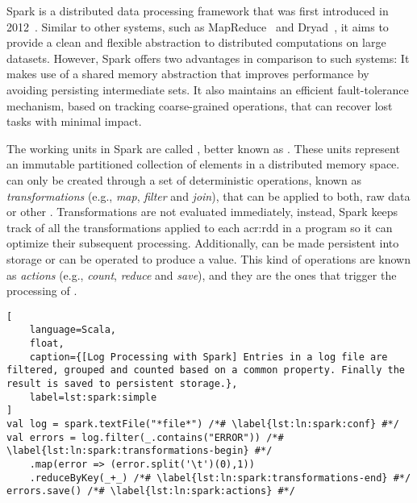 \label{sec:spark}


Spark is a distributed data processing framework that was first introduced in 2012~\cite{Zaharia2012a}. Similar to other systems, such as MapReduce~\cite{Dean2008} and Dryad~\cite{Isard2007}, it aims to provide a clean and flexible abstraction to distributed computations on large datasets. However, Spark offers two advantages in comparison to such systems: It makes use of a shared memory abstraction that improves performance by avoiding persisting intermediate sets. It also maintains an efficient fault-tolerance mechanism, based on tracking coarse-grained operations, that can recover lost tasks with minimal impact.

The working units in Spark are called \textit{}, better known as . These units represent an immutable partitioned collection of elements in a distributed memory space.  can only be created through a set of deterministic operations, known as \textit{transformations} (e.g., \textit{map}, \textit{filter} and \textit{join}), that can be applied to both, raw data or other . Transformations are not evaluated immediately, instead,  Spark keeps track of all the transformations applied to each \acrshort{acr:rdd} in a program so it can optimize their subsequent processing. Additionally,  can be made persistent into storage or can be operated to produce a value. This kind of operations are known as \textit{actions} (e.g., \textit{count}, \textit{reduce} and \textit{save}), and they are the ones that trigger the processing of .

\begin{lstlisting}[
	language=Scala,
	float,
	caption={[Log Processing with Spark] Entries in a log file are filtered, grouped and counted based on a common property. Finally the result is saved to persistent storage.},
	label=lst:spark:simple
]
val log = spark.textFile("*file*") /*# \label{lst:ln:spark:conf} #*/
val errors = log.filter(_.contains("ERROR")) /*# \label{lst:ln:spark:transformations-begin} #*/
	.map(error => (error.split('\t')(0),1))
	.reduceByKey(_+_) /*# \label{lst:ln:spark:transformations-end} #*/
errors.save() /*# \label{lst:ln:spark:actions} #*/
\end{lstlisting}

